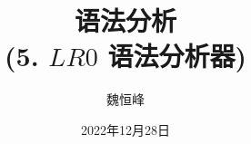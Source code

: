 \documentclass[]{beamer}
\title[语法分析]{语法分析 \\ (5. $LR0$ 语法分析器)}
\author[魏恒峰]{\large 魏恒峰}
\institute{hfwei@nju.edu.cn}
\date{2022年12月28日}
\begin{document}
\maketitle



\thankyou{}

\end{document}
